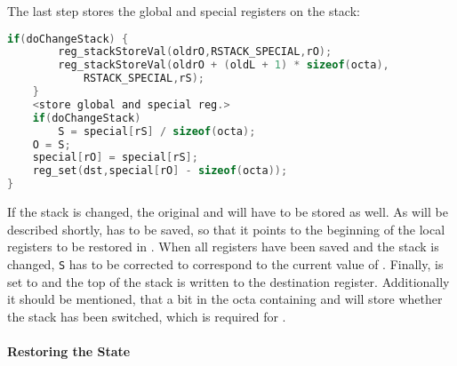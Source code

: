 The last step stores the global and special registers on the stack:
\begin{lstlisting}[language=C,caption={Implementation of {\tt reg\_save}, part 3 (partially pseudo-code)}]
	if(doChangeStack) {
		reg_stackStoreVal(oldrO,RSTACK_SPECIAL,rO);
		reg_stackStoreVal(oldrO + (oldL + 1) * sizeof(octa),
			RSTACK_SPECIAL,rS);
	}
	<store global and special reg.>
	if(doChangeStack)
		S = special[rS] / sizeof(octa);
	O = S;
	special[rO] = special[rS];
	reg_set(dst,special[rO] - sizeof(octa));
}
\end{lstlisting}
If the stack is changed, the original  and  will have to be stored as well. As will be described shortly,  has to be saved, so that it points to the beginning of the local registers to be restored in . When all registers have been saved and the stack is changed, {\tt S} has to be corrected to correspond to the current value of . Finally,  is set to  and the top of the stack is written to the destination register. Additionally it should be mentioned, that a bit in the octa containing  and  will store whether the stack has been switched, which is required for .

\paragraph{Restoring the State}

